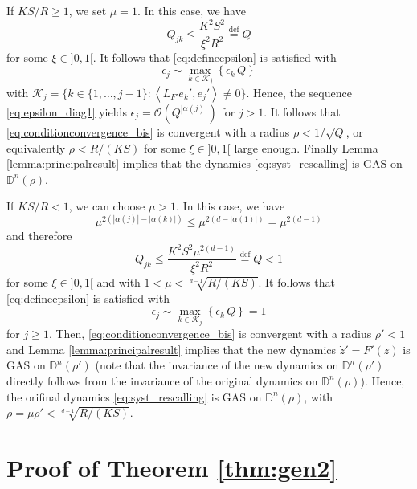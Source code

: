 \documentclass{article}
\begin{document}
If $KS/R \geq 1$, we set $\mu=1$. In this case, we have
\[ Q_{jk}\leq \dfrac{K^2S^2}{\xi^2R^2} \stackrel{\text{def}}{=}Q \]
for some $\xi\in]0,1[$. It follows that \eqref{eq:defineepsilon} is satisfied with
\begin{equation}
\label{eq:epsilon_diag1}
\epsilon_j \sim \max_{k\in \mathcal{K}_j} \left\{\epsilon_k\, Q \right\}
\end{equation}
with $\mathcal{K}_j=\{k \in\{1,\dots,j-1\} : \left\langle L_{F'} e_k',  e_j' \right\rangle \neq 0  \}$. Hence, the sequence \eqref{eq:epsilon_diag1} yields $\epsilon_j=\mathcal{O}(Q^{|\alpha(j)|})$ for $j > 1$. It follows that \eqref{eq:conditionconvergence_bis} is convergent with a radius $\rho< 1/\sqrt{Q}$, or equivalently $\rho<R/(KS)$ for some $\xi\in]0,1[$ large enough. Finally Lemma \ref{lemma:principalresult} implies that the dynamics \eqref{eq:syst_rescalling} is GAS on $\mathbb{D}^n(\rho)$.

If $KS/R<1$, we can choose $\mu>1$. In this case, we have
\[\mu^{2 \left(|\alpha(j) |- |\alpha(k) |\right)} \leq \mu^{2 \left(d- |\alpha(1) |\right)}=\mu^{2  \left(d- 1\right) } \]
and therefore
\[ Q_{jk}\leq \dfrac{K^2S^2\mu^{2\left(d- 1\right)}}{\xi^2R^2} \stackrel{\text{def}}{=}Q <1\]
for some $\xi\in]0,1[$ and with $1<\mu<\sqrt[d-1]{R/(KS)}$.
It follows that \eqref{eq:defineepsilon} is satisfied with
\begin{equation*}
\epsilon_j \sim \max_{k\in \mathcal{K}_j} \left\{\epsilon_k\, Q \right\} = 1
\end{equation*}
for $j \geq 1$. Then, \eqref{eq:conditionconvergence_bis} is convergent with a radius $\rho'< 1$ and Lemma \ref{lemma:principalresult} implies that the new dynamics $\dot{z}'=F'(z)$ is GAS on $\mathbb{D}^n(\rho')$ (note that the invariance of the new dynamics on $\mathbb{D}^n(\rho')$ directly follows from the invariance of the original dynamics on $\mathbb{D}^n(\rho)$). Hence, the orifinal dynamics \eqref{eq:syst_rescalling} is GAS on $\mathbb{D}^n(\rho)$, with $\rho=\mu \rho' <  \sqrt[d-1]{R/(KS)}$.

 

\section{Proof of Theorem \ref{thm:gen2}}
\label{sec:appendix_proof2}
\end{document}
